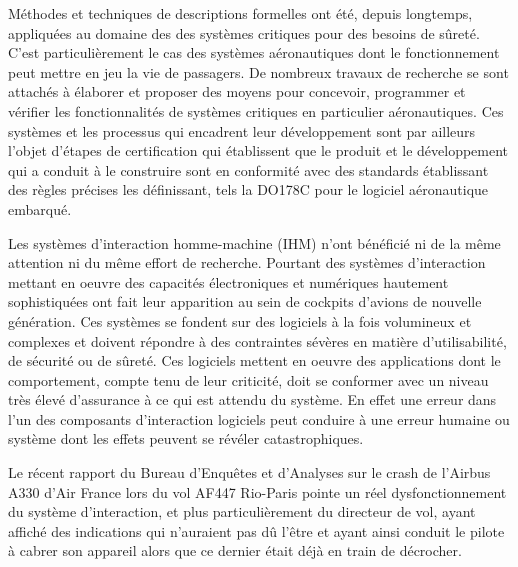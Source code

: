 \documentclass{ihm}
\begin{document}
Méthodes  et  techniques de  descriptions  formelles  ont été,  depuis
longtemps, appliquées au  domaine des des systèmes  critiques pour des
besoins  de  sûreté.  C'est   particulièrement  le  cas  des  systèmes
aéronautiques  dont le  fonctionnement peut  mettre en  jeu la  vie de
passagers.   De  nombreux travaux  de  recherche  se sont  attachés  à
élaborer et proposer des moyens pour concevoir, programmer et vérifier
les   fonctionnalités    de   systèmes   critiques    en   particulier
aéronautiques.   Ces  systèmes et  les  processus  qui encadrent  leur
développement sont par ailleurs  l'objet d'étapes de certification qui
établissent que  le produit  et le  développement qui  a conduit  à le
construire  sont  en conformité  avec  des  standards établissant  des
règles précises les définissant, tels  la DO178C \cite{DO178C} pour le
logiciel aéronautique embarqué.

Les systèmes  d'interaction homme-machine (IHM) n'ont  bénéficié ni de
la  même attention  ni  du  même effort  de  recherche.  Pourtant  des
systèmes d'interaction  mettant en oeuvre des  capacités électroniques
et numériques hautement sophistiquées ont fait leur apparition au sein
de cockpits d'avions de nouvelle  génération.  Ces systèmes se fondent
sur  des  logiciels à  la  fois  volumineux  et complexes  et  doivent
répondre  à des  contraintes  sévères en  matière d'utilisabilité,  de
sécurité  ou  de   sûreté.   Ces  logiciels  mettent   en  oeuvre  des
applications dont le comportement, compte tenu de leur criticité, doit
se  conformer avec  un  niveau très  élevé d'assurance  à  ce qui  est
attendu  du système.  En effet  une  erreur dans  l'un des  composants
d'interaction logiciels peut conduire à  une erreur humaine ou système
dont les effets peuvent se révéler catastrophiques.

Le récent rapport du Bureau  d'Enquêtes et d'Analyses \cite{BEA12} sur
le crash  de l'Airbus A330  d'Air France  lors du vol  AF447 Rio-Paris
pointe  un réel  dysfonctionnement du  système d'interaction,  et plus
particulièrement du  directeur de  vol, ayant affiché  des indications
qui n'auraient pas dû l'être et ayant ainsi conduit le pilote à cabrer
son appareil alors que ce dernier était déjà en train de décrocher.
\end{document}
